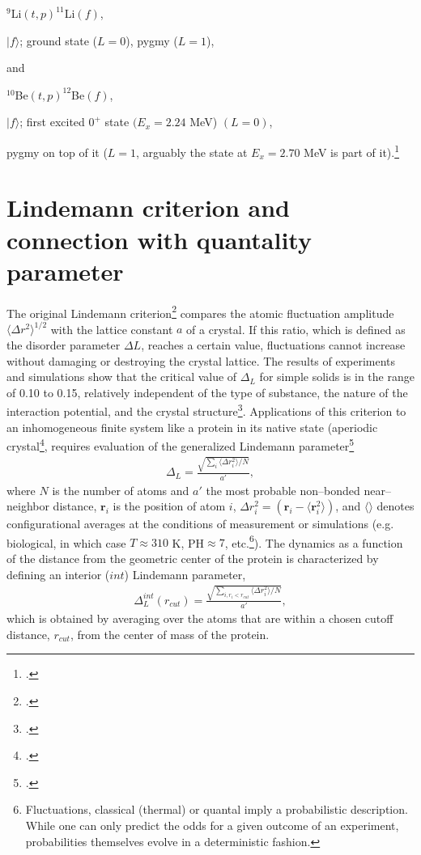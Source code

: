 \begin{subappendices}
\centerline{$^{9}$Li$(t,p)^{11}$Li$(f)$,}
\vspace{0.2cm}
\centerline{$|f\rangle$; ground state ($L=0$), pygmy ($L=1$),}
\vspace{0.3cm}
and\\
\vspace{0.3cm}
\centerline{$^{10}$Be$(t,p)^{12}$Be$(f)$,}
\vspace{0.2cm}
\centerline{$|f\rangle$; first excited $0^+$ state $(E_x=2.24$ MeV) $(L=0)$,}
\vspace{0.2cm}
pygmy on top of it ($L=1$, arguably the state at $E_x=2.70$ MeV is part of it).\footnote{\cite{Iwasaki:00}.}
\section[Lindemann criterion and  quantality parameter]{Lindemann criterion and connection with quantality parameter}\label{C2AppC}
The original Lindemann criterion\footnote{\cite{Lindemann:10}.} compares the atomic fluctuation amplitude $\langle\Delta r^2\rangle^{1/2}$ with the lattice constant $a$ of a crystal. If this ratio, which is defined as the disorder parameter $\Delta L$, reaches a certain value, fluctuations cannot increase without damaging or destroying the crystal lattice. The results of experiments and simulations show that the critical value of $\Delta_L$ for simple solids is in the range of 0.10 to 0.15, relatively independent of the type of substance, the nature of the interaction potential, and the crystal structure\footnote{\cite{Bilgram:87,Lowen:94,Stillinger:95}.}. Applications of this criterion to an inhomogeneous finite system like a protein in its native state (aperiodic crystal\footnote{\cite{Schrodinger:44}.}, requires evaluation of the generalized Lindemann parameter\footnote{\cite{Stillinger:90}.}
\begin{align}
\Delta_L=\frac{\sqrt{\sum_i\langle \Delta r_i^2\rangle/N}}{a'},
\end{align}  
where $N$ is the number of atoms and $a'$ the most probable non--bonded near--neighbor distance, $\mathbf r_i$ is the position of atom $i$, $\Delta r_i^2=(\mathbf r_i-\langle \mathbf r_i^2\rangle)$, and $\langle\rangle$ denotes configurational averages at the conditions of measurement or simulations (e.g. biological, in which case $T\approx 310$ K, PH$\approx 7$, etc.\footnote{Fluctuations, classical (thermal) or quantal imply a probabilistic description. While one can only predict the odds for a given outcome of an experiment, probabilities themselves evolve in a deterministic fashion.}). The dynamics as a function of the distance from the geometric center of the protein is characterized by defining an interior ($int$) Lindemann parameter, 
\begin{align}
\Delta^{int}_L(r_{cut})=\frac{\sqrt{\sum_{i,r_i<r_{cut}}\langle \Delta r_i^2\rangle/N}}{a'},
\end{align}  
which is obtained by averaging over the atoms that are within a chosen cutoff distance, $r_{cut}$, from the center of mass of the protein.


\end{subappendices}
